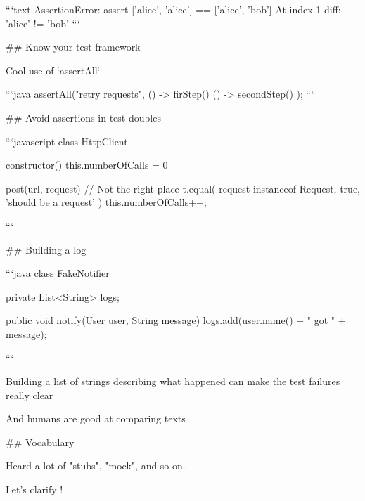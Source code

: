 ```text
AssertionError:
  assert ['alice', 'alice'] == ['alice', 'bob']
  At index 1 diff: 'alice' != 'bob'
```

## Know your test framework

Cool use of `assertAll`

```java
assertAll("retry requests",
  () -> firStep()
  () -> secondStep()
);
```

## Avoid assertions in test doubles

```javascript
class HttpClient {
  constructor() {
    this.numberOfCalls = 0
  }

  post(url, request) {
    // Not the right place
    t.equal(
        request instanceof Request, true,
        'should be a request'
    )
    this.numberOfCalls++;
  }
}
```


## Building a log


```java
class FakeNotifier {
  private List<String> logs;

  public void notify(User user, String message) {
      logs.add(user.name() + " got " + message);
   }
}
```

Building a list of strings describing what happened
can make the test failures really clear

And humans are good at comparing texts


## Vocabulary

Heard a lot of "stubs", "mock", and so on.

Let's clarify !

